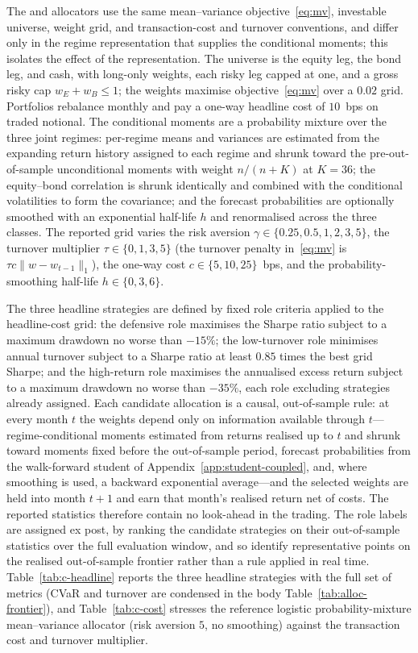 The \Acoup{} and \Bindep{} allocators use the same mean--variance objective~\eqref{eq:mv},
investable universe, weight grid, and transaction-cost and turnover conventions, and differ
only in the regime representation that supplies the conditional moments; this isolates the
effect of the representation. The universe is the equity leg, the bond leg, and cash, with
long-only weights, each risky leg capped at one, and a gross risky cap $w_E+w_B\le 1$; the
weights maximise objective~\eqref{eq:mv} over a $0.02$ grid. Portfolios rebalance monthly and
pay a one-way headline cost of $10$~bps on traded notional. The conditional moments are a
probability mixture over the three joint regimes: per-regime means and variances are estimated
from the expanding return history assigned to each regime and shrunk toward the
pre-out-of-sample unconditional moments with weight $n/(n+K)$ at $K=36$; the equity--bond
correlation is shrunk identically and combined with the conditional volatilities to form the
covariance; and the forecast probabilities are optionally smoothed with an exponential
half-life $h$ and renormalised across the three classes. The reported grid varies the risk
aversion $\gamma\in\{0.25,0.5,1,2,3,5\}$, the turnover multiplier $\tau\in\{0,1,3,5\}$
(the turnover penalty in~\eqref{eq:mv} is $\tau c\lVert w-w_{t-1}\rVert_1$), the one-way cost
$c\in\{5,10,25\}$~bps, and the probability-smoothing half-life $h\in\{0,3,6\}$.

The three headline strategies are defined by fixed role criteria applied to the headline-cost
grid: the defensive role maximises the Sharpe ratio subject to a maximum drawdown no worse than
$-15\%$; the low-turnover role minimises annual turnover subject to a Sharpe ratio at least
$0.85$ times the best grid Sharpe; and the high-return role maximises the annualised excess
return subject to a maximum drawdown no worse than $-35\%$, each role excluding strategies
already assigned. Each candidate allocation is a causal, out-of-sample rule: at every month $t$
the weights depend only on information available through $t$---regime-conditional moments
estimated from returns realised up to $t$ and shrunk toward moments fixed before the
out-of-sample period, forecast probabilities from the walk-forward student of
Appendix~\ref{app:student-coupled}, and, where smoothing is used, a backward exponential
average---and the selected weights are held into month $t+1$ and earn that month's realised
return net of costs. The reported statistics therefore contain no look-ahead in the trading.
The role labels are assigned ex post, by ranking the candidate strategies on their
out-of-sample statistics over the full evaluation window, and so identify representative points
on the realised out-of-sample frontier rather than a rule applied in real time.
Table~\ref{tab:c-headline} reports the three headline strategies with the full set of metrics
(CVaR and turnover are condensed in the body Table~\ref{tab:alloc-frontier}), and
Table~\ref{tab:c-cost} stresses the reference logistic probability-mixture mean--variance
allocator (risk aversion $5$, no smoothing) against the transaction cost and turnover
multiplier.

